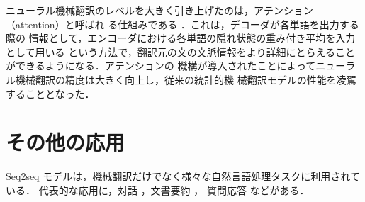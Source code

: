 ニューラル機械翻訳のレベルを大きく引き上げたのは，アテンション（attention）と呼ばれ
る仕組みである \cite{bahdanau2015nmt}．これは，デコーダが各単語を出力する際の
情報として，エンコーダにおける各単語の隠れ状態の重み付き平均を入力として用いる
という方法で，翻訳元の文の文脈情報をより詳細にとらえることができるようになる．アテンションの
機構が導入されたことによってニューラル機械翻訳の精度は大きく向上し，従来の統計的機
械翻訳モデルの性能を凌駕することとなった．

\section{その他の応用}

Seq2seq モデルは，機械翻訳だけでなく様々な自然言語処理タスクに利用されている．
代表的な応用に，対話 \cite{vinyals2015neural}，文書要約 \cite{rush2015neural}，
質問応答 \cite{pmlr-v48-kumar16} などがある．










